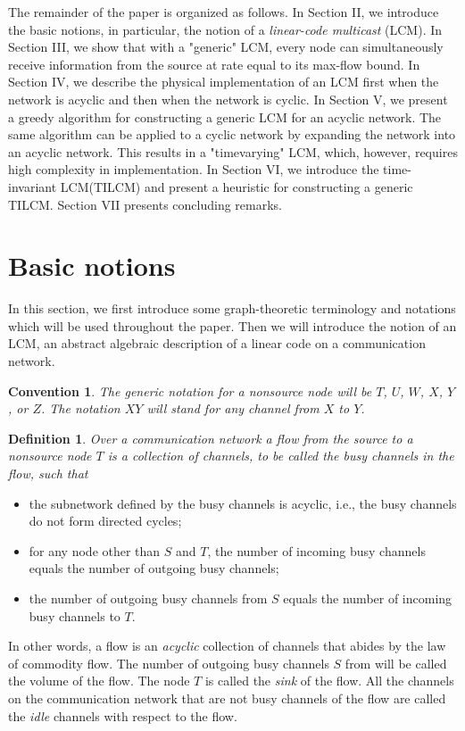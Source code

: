 \documentclass[journal]{IEEEtran}
\newtheorem*{defi}{Definition}
\newtheorem*{conv}{Convention}
\begin{document}
\par
The remainder of the paper is organized as follows. In Section II, we introduce the basic notions, in particular, the notion of a \emph{linear-code multicast} (LCM). In Section III, we show that with a "generic" LCM, every node can simultaneously receive information from the source at rate equal to its max-flow bound. In Section IV, we describe the physical implementation of an LCM first when the network is acyclic and then when the network is cyclic. In Section V, we present a greedy algorithm for constructing a generic LCM for an acyclic network. The same algorithm can be applied to a cyclic network by expanding the network into an acyclic network. This results in a "timevarying" LCM, which, however, requires high complexity in implementation. In Section VI, we introduce the time-invariant LCM(TILCM) and present a heuristic for constructing a generic TILCM. Section VII presents concluding remarks.

\section{Basic notions}\label{sec:basic}
\par
In this section, we first introduce some graph-theoretic terminology and notations which will be used throughout the paper. Then we will introduce the notion of an LCM, an abstract algebraic description of a linear code on a communication network.

\begin{conv}
	The generic notation for a nonsource node will be $T$, $U$, $W$, $X$, $Y$, or $Z$. The notation $XY$ will stand for any channel from $X$ to $Y$.
\end{conv}
\begin{defi}
	Over a communication network a \emph{flow} from the source to a nonsource node $T$ is a collection of channels, to be called the busy channels in the flow, such that
\end{defi}

\begin{itemize}
	\item[1)] the subnetwork defined by the busy channels is acyclic, i.e., the busy channels do not form directed cycles;
	\item[2)] for any node other than $S$ and $T$, the number of incoming busy channels equals the number of outgoing 	busy channels;
	\item[3)] the number of outgoing busy channels from $S$ equals the number of incoming busy channels to $T$.
\end{itemize}
\par
In other words, a flow is an \emph{acyclic} collection of channels that abides by the law of commodity flow. The number of outgoing busy channels $S$ from will be called the volume of the flow. The node $T$ is called the \emph{sink} of the flow. All the channels on the communication network that are not busy channels of the flow are called the \emph{idle} channels with respect to the flow.
\end{document}
